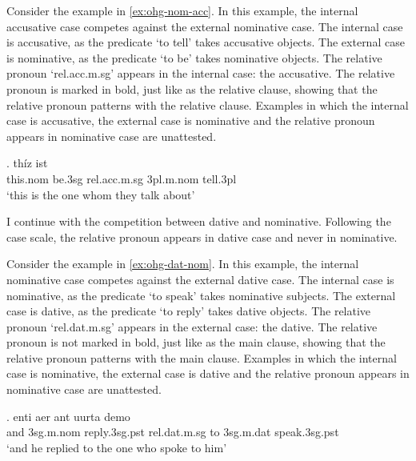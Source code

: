 Consider the example in \ref{ex:ohg-nom-acc}. In this example, the internal accusative case competes against the external nominative case.
The internal case is accusative, as the predicate  `to tell' takes accusative objects.
The external case is nominative, as the predicate  `to be' takes nominative objects.
The relative pronoun  `\ac{rel}.\ac{acc}.\ac{m}.\ac{sg}' appears in the internal case: the accusative. The relative pronoun is marked in bold, just like as the relative clause, showing that the relative pronoun patterns with the relative clause.
Examples in which the internal case is accusative, the external case is nominative and the relative pronoun appears in nominative case are unattested.

\exg. thíz ist   \\
this.\ac{nom} be.3\ac{sg}\scsub{[nom]} \ac{rel}.\ac{acc}.\ac{m}.\ac{sg} 3\ac{pl}.\ac{m}.\ac{nom} tell.3\ac{pl}\scsub{[acc]}\\
`this is the one whom they talk about' \label{ex:ohg-nom-acc}

I continue with the competition between dative and nominative. Following the case scale, the relative pronoun appears in dative case and never in nominative.

Consider the example in \ref{ex:ohg-dat-nom}. In this example, the internal nominative case competes against the external dative case.
The internal case is nominative, as the predicate  `to speak' takes nominative subjects.
The external case is dative, as the predicate  `to reply' takes dative objects.
The relative pronoun  `\ac{rel}.\ac{dat}.\ac{m}.\ac{sg}' appears in the external case: the dative. The relative pronoun is not marked in bold, just like as the main clause, showing that the relative pronoun patterns with the main clause.
Examples in which the internal case is nominative, the external case is dative and the relative pronoun appears in nominative case are unattested.

\exg. enti aer {ant uurta} demo  \\
and 3\ac{sg}.\ac{m}.\ac{nom} reply.3\ac{sg}.\ac{pst}\scsub{[dat]} \ac{rel}.\ac{dat}.\ac{m}.\ac{sg} {to 3\ac{sg}.\ac{m}.\ac{dat}} speak.3\ac{sg}.\ac{pst}\scsub{[nom]}\\
`and he replied to the one who spoke to him' \label{ex:ohg-dat-nom}

